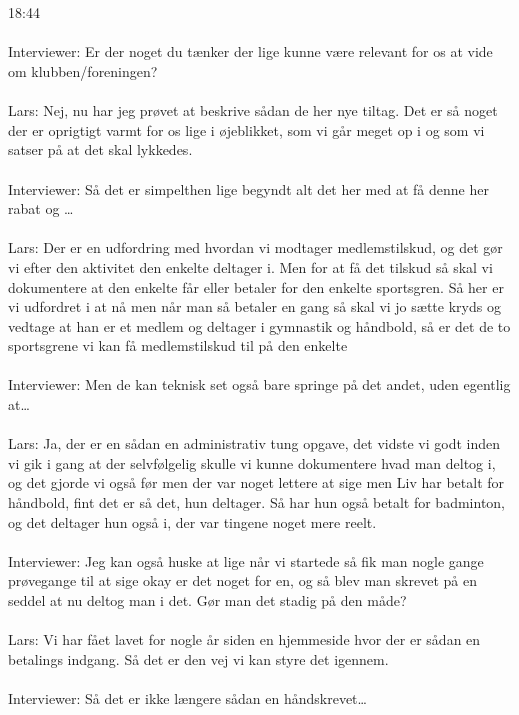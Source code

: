 \\\\
18:44
\\\\
Interviewer: Er der noget du tænker der lige kunne være relevant for os at vide om klubben/foreningen? 
\\\\ 
Lars: Nej, nu har jeg prøvet at beskrive sådan de her nye tiltag. Det er så noget der er oprigtigt varmt for os lige i øjeblikket, som vi går meget op i og som vi satser på at det skal lykkedes.
\\\\
Interviewer: Så det er simpelthen lige begyndt alt det her med at få denne her rabat og … 
\\\\
Lars: Der er en udfordring med hvordan vi modtager medlemstilskud, og det gør vi efter den aktivitet den enkelte deltager i. Men for at få det tilskud så skal vi dokumentere at den enkelte får eller betaler for den enkelte sportsgren. Så her er vi udfordret i at nå men når man så betaler en gang så skal vi jo sætte kryds og vedtage at han er et medlem og deltager i gymnastik og håndbold, så er det de to sportsgrene vi kan få medlemstilskud til på den enkelte
\\\\
Interviewer: Men de kan teknisk set også bare springe på det andet, uden egentlig at…
\\\\
Lars: Ja, der er en sådan en administrativ tung opgave, det vidste vi godt inden vi gik i gang at der selvfølgelig skulle vi kunne dokumentere hvad man deltog i, og det gjorde vi også før men der var noget lettere at sige men Liv har betalt for håndbold, fint det er så det, hun deltager. Så har hun også betalt for badminton, og det deltager hun også i, der var tingene noget mere reelt.
\\\\
Interviewer: Jeg kan også huske at lige når vi startede så fik man nogle gange prøvegange til at sige okay er det noget for en, og så blev man skrevet på en seddel at nu deltog man i det. Gør man det stadig på den måde?
\\\\
Lars: Vi har fået lavet for nogle år siden en hjemmeside hvor der er sådan en betalings indgang. Så det er den vej vi kan styre det igennem.
\\\\
Interviewer: Så det er ikke længere sådan en håndskrevet…
